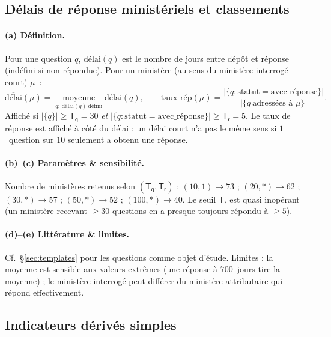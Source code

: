 \documentclass[11pt,a4paper]{article}
\newcommand{\param}[1]{\ensuremath{\mathsf{#1}}}
\begin{document}
\subsection{Délais de réponse ministériels et classements}\label{sec:delais}

\paragraph{(a) Définition.} Pour une question $q$, $\text{délai}(q)$ est le
nombre de jours entre dépôt et réponse (indéfini si non répondue). Pour un ministère
(au sens du \og{}ministère interrogé\fg{} court) $\mu$~:
\[
\overline{\text{délai}}(\mu)=\operatorname*{moyenne}_{q:\,\text{délai}(q)\ \text{défini}}\text{délai}(q),\qquad
\text{taux\_rép}(\mu)=\frac{|\{q:\text{statut}=\text{avec\_réponse}\}|}{|\{q\ \text{adressées à }\mu\}|}.
\]
Affiché si $|\{q\}|\ge \param{T_q}=30$ \emph{et} $|\{q:\text{statut}=\text{avec\_réponse}\}|\ge \param{T_r}=5$.
Le taux de réponse est affiché à côté du délai : un délai court n'a pas le même sens
si $1$~question sur $10$ seulement a obtenu une réponse.

\paragraph{(b)--(c) Paramètres \& sensibilité.} Nombre de ministères retenus selon
$(\param{T_q},\param{T_r})$ : $(10,1)\to 73$ ; $(20,*)\to 62$ ; $(30,*)\to 57$ ;
$(50,*)\to 52$ ; $(100,*)\to 40$. Le seuil $\param{T_r}$ est quasi inopérant (un
ministère recevant $\ge 30$ questions en a presque toujours répondu à $\ge 5$).

\paragraph{(d)--(e) Littérature \& limites.} Cf.~§\ref{sec:templates} pour les
questions comme objet d'étude. Limites : la moyenne est sensible aux valeurs
extrêmes (une réponse à $700$~jours tire la moyenne) ; le \og{}ministère interrogé\fg{}
peut différer du \og{}ministère attributaire\fg{} qui répond effectivement.

\subsection{Indicateurs dérivés simples}\label{sec:simples}
\end{document}
